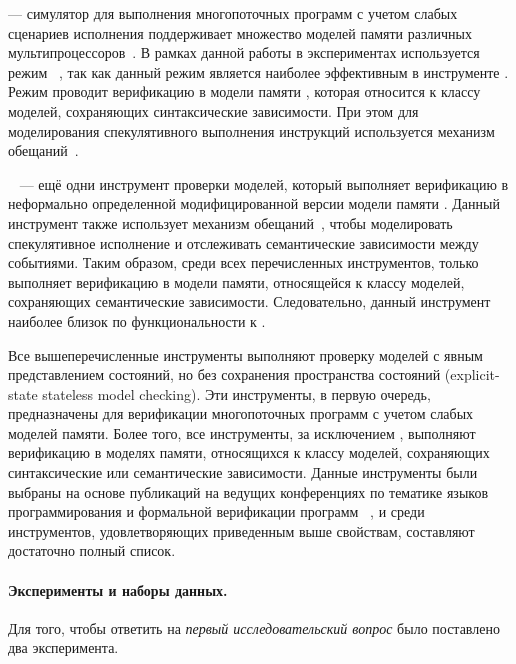 \textbf{\rmem} --- симулятор для выполнения многопоточных программ с учетом слабых сценариев исполнения  поддерживает множество моделей памяти различных мультипроцессоров~\cite{RMEM}. 
В рамках данной работы в экспериментах используется режим \PrmARM%
~\cite{Pulte-al:PLDI2019}, так как данный режим является 
наиболее эффективным в инструменте \rmem.
Режим \PrmARM проводит верификацию в модели памяти , 
которая относится к классу моделей, сохраняющих синтаксические зависимости. 
При этом для моделирования спекулятивного выполнения инструкций 
используется механизм обещаний~\cite{Kang-al:POPL17}.  

\textbf{\CDSChecker}~\cite{Norris-Demsky:OOPSLA2013} --- 
ещё одни инструмент проверки моделей, который выполняет  верификацию 
в неформально определенной модифицированной версии модели памяти \CMM.
Данный инструмент также использует механизм обещаний~\cite{Kang-al:POPL17}, 
чтобы моделировать спекулятивное исполнение и отслеживать
семантические зависимости между событиями. 
Таким образом, среди всех перечисленных инструментов,
только \CDSChecker выполняет верификацию в модели памяти, 
относящейся к классу моделей, сохраняющих семантические зависимости. 
Следовательно, данный инструмент наиболее близок по функциональности к \wmc.

Все вышеперечисленные инструменты выполняют проверку 
моделей с явным представлением состояний, 
но без сохранения пространства состояний (explicit-state stateless model checking). 
Эти инструменты, в первую очередь, предназначены 
для верификации многопоточных программ с учетом слабых моделей памяти. 
Более того, все инструменты, за исключением \genmc, выполняют верификацию 
в моделях памяти, относящихся к классу моделей, 
сохраняющих синтаксические или семантические зависимости. 
Данные инструменты были выбраны на основе публикаций 
на ведущих конференциях по тематике языков программирования 
и формальной верификации программ%
~\cite{Kokologiannakis:PLDI2019,Kokologiannakis:CAD2021,Kokologiannakis-Vafeiadis:ASPLOS2020,
Abdulla-al:TACAS2015,Abdulla-al:CAV2016,Pulte-al:PLDI2019,Norris-Demsky:OOPSLA2013}, 
и среди инструментов, удовлетворяющих приведенным выше свойствам, 
составляют достаточно полный список.


\paragraph{Эксперименты и наборы данных.} 

Для того, чтобы ответить на \emph{первый исследовательский вопрос} 
было поставлено два эксперимента. 

